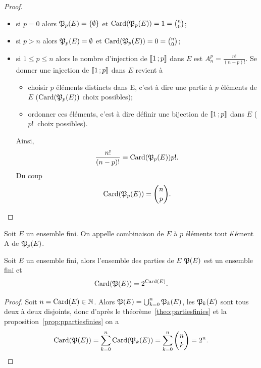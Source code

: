 \begin{proof}
  \begin{itemize}
    \item si \(p = 0\) alors \(\mathfrak{P}_p(E) = \{\emptyset\}\) et 
      \(\operatorname{Card}(\mathfrak{P}_p(E)) = 1 = \binom{n}{0}\);
    \item si \(p>n\) alors \(\mathfrak{P}_p(E) = \emptyset\) et \(\operatorname{Card}(\mathfrak{P}_p(E)) = 0 
      = \binom{n}{0}\);
    \item si \(1\leqslant p \leqslant n\) alors le nombre d'injection de 
      \(\mathopen{\llbracket}1\mathclose{}\mathpunct{};p\mathclose{\rrbracket}\) dans \(E\) est \(A_{n}^p = \frac{n!}{(n - 
      p)!}\).  Se donner une injection de  \(\mathopen{\llbracket}1\mathclose{}\mathpunct{};p\mathclose{\rrbracket}\) dans 
      \(E\) revient à
      \begin{itemize}
        \item choisir \(p\) éléments distincts dans E, c'est à dire une partie à 
          \(p\) éléments de \(E\) (\(\operatorname{Card}(\mathfrak{P}_p(E))\) choix possibles);
        \item ordonner ces éléments, c'est à dire définir une bijection de 
          \(\mathopen{\llbracket}1\mathclose{}\mathpunct{};p\mathclose{\rrbracket}\) dans \(E\) (\(p!~\) choix possibles).
      \end{itemize}
      Ainsi,
      \begin{equation}
        \frac{n!}{(n - p)!} = \operatorname{Card}(\mathfrak{P}_p(E)) p!.
      \end{equation}
      Du coup
      \begin{equation}
        \operatorname{Card}(\mathfrak{P}_p(E)) = \binom{n}{p}.
      \end{equation}
  \end{itemize}
\end{proof}

\begin{defdef}
  Soit \(E\) un ensemble fini. On appelle combinaison de \(E\) à \(p\) éléments 
  tout élément A de \(\mathfrak{P}_p(E)\).
\end{defdef}

\begin{prop}
  Soit \(E\) un ensemble fini, alors l'ensemble des parties de \(E\) 
  \(\mathfrak{P}(E)\) est un ensemble fini et
  \begin{equation}
    \operatorname{Card}(\mathfrak{P}(E)) = 2^{\operatorname{Card}(E)}.
  \end{equation}
\end{prop}

\begin{proof}
  Soit \(n = \operatorname{Card}(E)\in \mathbb{N}\). Alors \(\mathfrak{P}(E) = \bigcup_{k = 
  0}^{n}\mathfrak{P}_k(E)\), les \(\mathfrak{P}_k(E)\) sont tous deux à deux disjoints, donc 
  d'après le théorème~\ref{theo:partiesfinies} et la 
  proposition~\ref{prop:ppartiesfinies} on a
  \begin{equation}
    \operatorname{Card}(\mathfrak{P}(E)) = \sum_{k = 0}^n \operatorname{Card}(\mathfrak{P}_k(E)) = \sum_{k = 0}^n 
    \binom{n}{k} = 2^n.
  \end{equation}
\end{proof}

